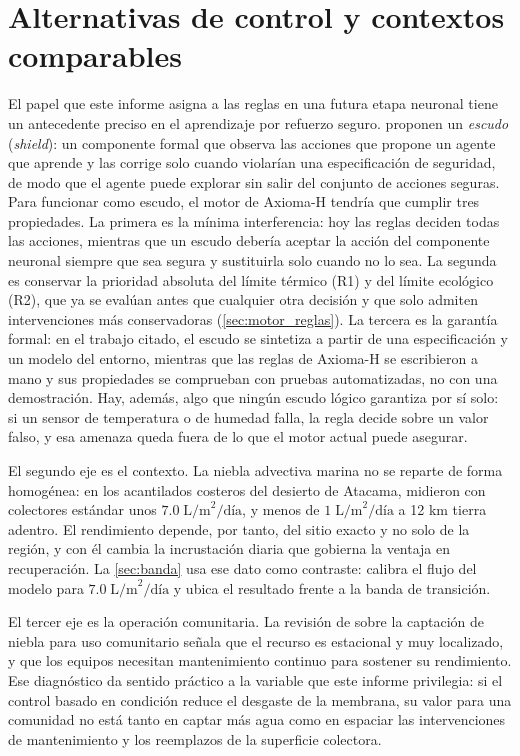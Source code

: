 \section{Alternativas de control y contextos comparables}
\label{sec:alternativas}
El papel que este informe asigna a las reglas en una futura etapa neuronal tiene un antecedente preciso en el aprendizaje por refuerzo seguro. \textcite{alshiekh2018shielding} proponen un \emph{escudo} (\emph{shield}): un componente formal que observa las acciones que propone un agente que aprende y las corrige solo cuando violar\'ian una especificaci\'on de seguridad, de modo que el agente puede explorar sin salir del conjunto de acciones seguras. Para funcionar como escudo, el motor de Axioma-H tendr\'ia que cumplir tres propiedades. La primera es la m\'inima interferencia: hoy las reglas deciden todas las acciones, mientras que un escudo deber\'ia aceptar la acci\'on del componente neuronal siempre que sea segura y sustituirla solo cuando no lo sea. La segunda es conservar la prioridad absoluta del l\'imite t\'ermico (R1) y del l\'imite ecol\'ogico (R2), que ya se eval\'uan antes que cualquier otra decisi\'on y que solo admiten intervenciones m\'as conservadoras (\cref{sec:motor_reglas}). La tercera es la garant\'ia formal: en el trabajo citado, el escudo se sintetiza a partir de una especificaci\'on y un modelo del entorno, mientras que las reglas de Axioma-H se escribieron a mano y sus propiedades se comprueban con pruebas automatizadas, no con una demostraci\'on. Hay, adem\'as, algo que ning\'un escudo l\'ogico garantiza por s\'i solo: si un sensor de temperatura o de humedad falla, la regla decide sobre un valor falso, y esa amenaza queda fuera de lo que el motor actual puede asegurar.

El segundo eje es el contexto. La niebla advectiva marina no se reparte de forma homog\'enea: en los acantilados costeros del desierto de Atacama, \textcite{cereceda2008spatial} midieron con colectores est\'andar unos $7.0\;\text{L/m}^2\text{/d\'ia}$, y menos de $1\;\text{L/m}^2\text{/d\'ia}$ a 12 km tierra adentro. El rendimiento depende, por tanto, del sitio exacto y no solo de la regi\'on, y con \'el cambia la incrustaci\'on diaria que gobierna la ventaja en recuperaci\'on. La \cref{sec:banda} usa ese dato como contraste: calibra el flujo del modelo para $7.0\;\text{L/m}^2\text{/d\'ia}$ y ubica el resultado frente a la banda de transici\'on.

El tercer eje es la operaci\'on comunitaria. La revisi\'on de \textcite{fessehaye2014fog} sobre la captaci\'on de niebla para uso comunitario se\~nala que el recurso es estacional y muy localizado, y que los equipos necesitan mantenimiento continuo para sostener su rendimiento. Ese diagn\'ostico da sentido pr\'actico a la variable que este informe privilegia: si el control basado en condici\'on reduce el desgaste de la membrana, su valor para una comunidad no est\'a tanto en captar m\'as agua como en espaciar las intervenciones de mantenimiento y los reemplazos de la superficie colectora.

